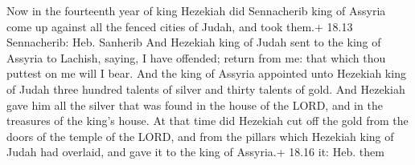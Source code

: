  Now in the fourteenth year of king Hezekiah did
Sennacherib king of Assyria come up against all the fenced cities of
Judah, and took them.+ 18.13 Sennacherib: Heb. Sanherib 
And Hezekiah king of Judah sent to the king of Assyria to Lachish,
saying, I have offended; return from me: that which thou puttest on me
will I bear. And the king of Assyria appointed unto Hezekiah king of
Judah three hundred talents of silver and thirty talents of gold.
 And Hezekiah gave him all the silver that was found in the
house of the LORD, and in the treasures of the king's house.
 At that time did Hezekiah cut off the gold from the doors
of the temple of the LORD, and from the pillars which Hezekiah king of
Judah had overlaid, and gave it to the king of Assyria.+ 18.16 it: Heb.
them

